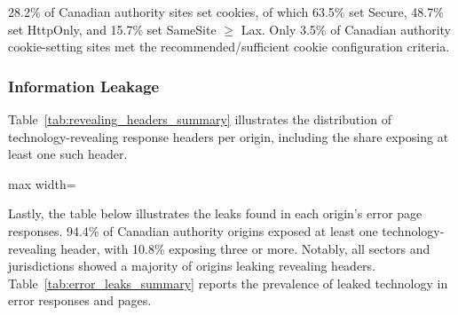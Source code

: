\documentclass[conference]{IEEEtran}
\begin{document}
28.2\% of Canadian authority sites set cookies, of which 63.5\% set Secure, 48.7\% set HttpOnly, and 15.7\% set SameSite $\geq$ Lax.
Only 3.5\% of Canadian authority cookie-setting sites met the recommended/sufficient cookie configuration criteria. 


\subsubsection{Information Leakage}

Table~\ref{tab:revealing_headers_summary} illustrates the distribution of 
technology-revealing response headers per origin, including the share exposing
 at least one such header.

    \begin{table}[t]
      \caption{Distribution of technology-revealing headers by dataset.}
      \label{tab:revealing_headers_summary}
      \centering
      \scriptsize
      \setlength{\tabcolsep}{3pt}
      \renewcommand{\arraystretch}{1.15}
    
      \begin{adjustbox}{max width=\columnwidth}
      \end{adjustbox}
    \end{table}
    
Lastly, the table below illustrates the leaks found in each origin's error page responses.
94.4\% of Canadian authority origins exposed at least one technology-revealing header, with 10.8\% exposing three or more.
Notably, all sectors and jurisdictions showed a majority of origins leaking revealing headers. Table~\ref{tab:error_leaks_summary} reports the prevalence
 of leaked technology in error responses and pages.
\end{document}

